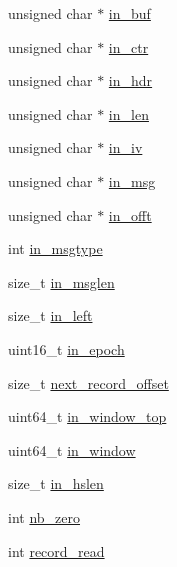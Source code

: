 \begin{DoxyCompactItemize}
\item 
unsigned char $\ast$ \hyperlink{structmbedtls__ssl__context_a81a9c513f47631c198d74cbeb4d1999f}{in\-\_\-buf}
\item 
unsigned char $\ast$ \hyperlink{structmbedtls__ssl__context_ab53517e77417e69419985902a528cc6a}{in\-\_\-ctr}
\item 
unsigned char $\ast$ \hyperlink{structmbedtls__ssl__context_ac1d0542cf430db2fb4b2855afc29fd5e}{in\-\_\-hdr}
\item 
unsigned char $\ast$ \hyperlink{structmbedtls__ssl__context_af7235ac32f8a336a7636c63af6ef2127}{in\-\_\-len}
\item 
unsigned char $\ast$ \hyperlink{structmbedtls__ssl__context_a77217f5c44f1ad2518a873030278628d}{in\-\_\-iv}
\item 
unsigned char $\ast$ \hyperlink{structmbedtls__ssl__context_a9c55d8cac2040048e56a6a2a694375c8}{in\-\_\-msg}
\item 
unsigned char $\ast$ \hyperlink{structmbedtls__ssl__context_af07148a2eb35b01d63b3f6d9b59e58df}{in\-\_\-offt}
\item 
int \hyperlink{structmbedtls__ssl__context_aa2283450c4e546808af09c943f115780}{in\-\_\-msgtype}
\item 
size\-\_\-t \hyperlink{structmbedtls__ssl__context_adfee31e1e5269ab17d1df707025df30a}{in\-\_\-msglen}
\item 
size\-\_\-t \hyperlink{structmbedtls__ssl__context_ae989f555c14b7c6286d7a4616860cb24}{in\-\_\-left}
\item 
uint16\-\_\-t \hyperlink{structmbedtls__ssl__context_ae6d4405b5829fb244a0d6a4ad1e20d91}{in\-\_\-epoch}
\item 
size\-\_\-t \hyperlink{structmbedtls__ssl__context_a97191c6503f07466475793478e195803}{next\-\_\-record\-\_\-offset}
\item 
uint64\-\_\-t \hyperlink{structmbedtls__ssl__context_a988404cded6bf548fa92b5800d20eb09}{in\-\_\-window\-\_\-top}
\item 
uint64\-\_\-t \hyperlink{structmbedtls__ssl__context_a0728b2d8fb513ca83853eb1a24bbdf38}{in\-\_\-window}
\item 
size\-\_\-t \hyperlink{structmbedtls__ssl__context_a8fa1f7b5ff4c594a3880e256a4044399}{in\-\_\-hslen}
\item 
int \hyperlink{structmbedtls__ssl__context_a4b988651d1c7320f119d3d80f9af7d94}{nb\-\_\-zero}
\item 
int \hyperlink{structmbedtls__ssl__context_adfba71d6f510182482d73cd8f1ffbccd}{record\-\_\-read}
\item 

\end{DoxyCompactItemize}
